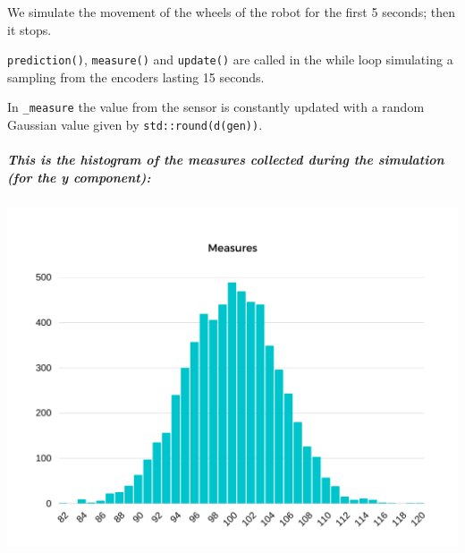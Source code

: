 \begin{Shaded}
\begin{Highlighting}[]
\OperatorTok{{-}\textgreater{}}\OperatorTok{(}\OperatorTok{);}
\OperatorTok{{-}\textgreater{}}\OperatorTok{();}

    \OperatorTok{++}\OperatorTok{[}\OperatorTok{{-}\textgreater{}}\OperatorTok{];}

\OperatorTok{=}\OperatorTok{+} \OperatorTok{;}
\OperatorTok{++;}
\OperatorTok{\}}
\end{Highlighting}
\end{Shaded}

We simulate the movement of the wheels of the robot for the first 5
seconds; then it stops.

\texttt{prediction()}, \texttt{measure()} and \texttt{update()} are
called in the while loop simulating a sampling from the encoders lasting
15 seconds.

In \texttt{\_measure} the value from the sensor is constantly updated
with a random Gaussian value given by \texttt{std::round(d(gen))}.

\hypertarget{this-is-the-histogram-of-the-measures-collected-during-the-simulation-for-the-y-component}{%
\subparagraph{This is the histogram of the measures collected during the
simulation (for the y
component):}\label{this-is-the-histogram-of-the-measures-collected-during-the-simulation-for-the-y-component}}

\includegraphics{pics/Measures.png}

